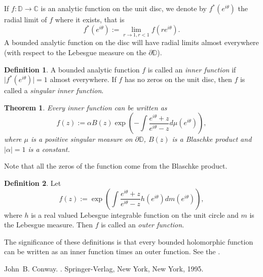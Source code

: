 \documentclass[12pt]{article}
\theoremstyle{theorem}
\newtheorem*{thm}{Theorem}
\theoremstyle{definition}
\newtheorem*{defn}{Definition}
\theoremstyle{remark}
\begin{document}
If $f \colon \mathbb{D} \to \mathbb{C}$ is an analytic function on the unit disc, we denote by
$f^*(e^{i\theta})$ the radial limit of $f$ where it exists, that is
\begin{equation*}
f^*(e^{i\theta}) := \lim_{r\to 1, r<1} f(re^{i\theta}) .
\end{equation*}
A bounded analytic function on the disc will have radial limits almost everywhere (with respect to the Lebesgue measure on the $\partial \mathbb{D}$).

\begin{defn}
A bounded analytic function $f$ is called an \emph{inner function} if $\lvert f^*(e^{i\theta}) \rvert = 1$ almost everywhere.  If $f$ has no zeros on the unit disc, then $f$ is called a \emph{singular inner function}. 
\end{defn}

\begin{thm}
Every inner function can be written as
\begin{equation*}
f(z) := \alpha B(z) \exp \left( - \int \frac{e^{i\theta}+z}{e^{i\theta}-z}d\mu(e^{i\theta}) \right) ,
\end{equation*}
where $\mu$ is a positive singular measure on $\partial \mathbb{D}$, $B(z)$
is a Blaschke product and $\lvert \alpha \rvert = 1$ is a constant.
\end{thm}

Note that all the zeros of the function come from the Blaschke product.

\begin{defn}
Let
\begin{equation*}
f(z) := \exp \left(\int \frac{e^{i\theta}+z}{e^{i\theta}-z}h(e^{i\theta})dm(e^{i\theta}) \right) ,
\end{equation*}
where $h$ is a real valued Lebesgue integrable function on the unit circle and $m$ is the Lebesgue measure.  Then $f$ is called
an \emph{outer function}.
\end{defn}

The significance of these definitions is that every bounded holomorphic function can be written as an inner function times an outer function.  See the .

\begin{thebibliography}{9}
John~B. Conway.
{\em {}}.
Springer-Verlag, New York, New York, 1995.
\end{thebibliography}
\end{document}
